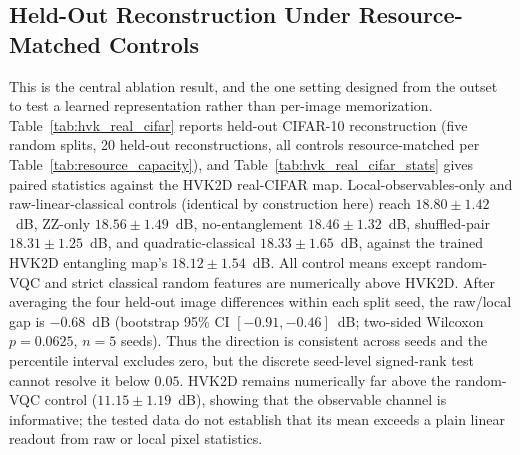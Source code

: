 \documentclass[11pt]{article}
\begin{document}
\subsection{Held-Out Reconstruction Under Resource-Matched Controls}
\label{sec:holdout_headline}
This is the central ablation result, and the one setting designed from the outset to test a learned representation rather than per-image memorization. Table~\ref{tab:hvk_real_cifar} reports held-out CIFAR-10 reconstruction (five random splits, 20 held-out reconstructions, all controls resource-matched per Table~\ref{tab:resource_capacity}), and Table~\ref{tab:hvk_real_cifar_stats} gives paired statistics against the HVK2D real-CIFAR map. Local-observables-only and raw-linear-classical controls (identical by construction here) reach $18.80\pm1.42$~dB, ZZ-only $18.56\pm1.49$~dB, no-entanglement $18.46\pm1.32$~dB, shuffled-pair $18.31\pm1.25$~dB, and quadratic-classical $18.33\pm1.65$~dB, against the trained HVK2D entangling map's $18.12\pm1.54$~dB. All control means except random-VQC and strict classical random features are numerically above HVK2D. After averaging the four held-out image differences within each split seed, the raw/local gap is $-0.68$~dB (bootstrap 95\% CI $[-0.91,-0.46]$~dB; two-sided Wilcoxon $p=0.0625$, $n=5$ seeds). Thus the direction is consistent across seeds and the percentile interval excludes zero, but the discrete seed-level signed-rank test cannot resolve it below $0.05$. HVK2D remains numerically far above the random-VQC control ($11.15\pm1.19$~dB), showing that the observable channel is informative; the tested data do not establish that its mean exceeds a plain linear readout from raw or local pixel statistics.
\end{document}
